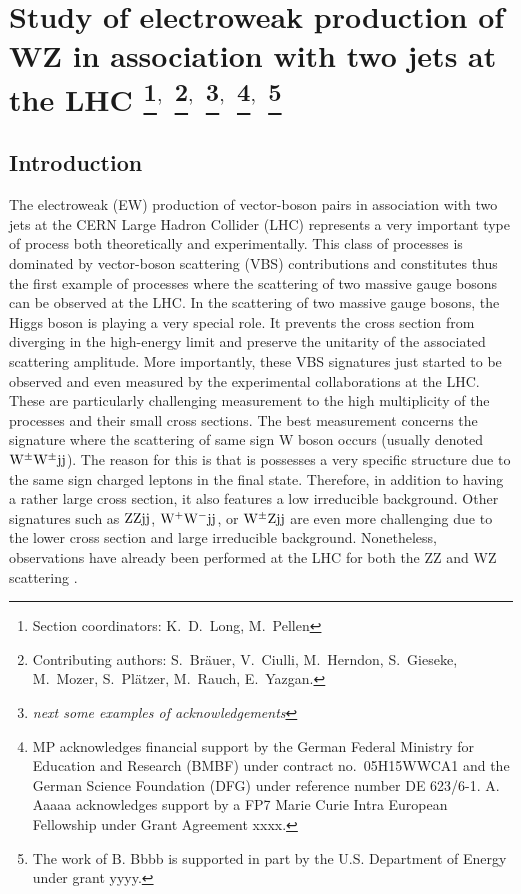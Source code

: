 \documentclass[11pt]{cernrep}
\newcommand{\MP}[1]{{ {\color{blue}{ [MP: #1]}} }}
\begin{document}
\section{Study of electroweak production of WZ in association with two
  jets at the LHC \protect\footnote{Section
    coordinators: K.~D.~Long, M.~Pellen}$^{,}$ \protect\footnote{Contributing authors:
    S.~Br\"auer, V.~Ciulli, M.~Herndon, S.~Gieseke, M.~Mozer, S.~Pl{\"a}tzer,
    M.~Rauch, E.~Yazgan.}$^{,}$
  \protect\footnote{{\it next some examples of acknowledgements}}$^{,}$
  \protect\footnote{MP acknowledges financial support by the
German Federal Ministry for Education and Research (BMBF) under
contract no.~05H15WWCA1 and the German Science Foundation (DFG) under
reference number DE 623/6-1. A. Aaaaa acknowledges support by a FP7 Marie
    Curie Intra European Fellowship under Grant Agreement xxxx.}$^{,}$
\protect\footnote{The work of B. Bbbb is supported in part by the
  U.S. Department of Energy under grant yyyy.} \label{vbs_section}}

\subsection{Introduction \label{vbs_intro}}

The electroweak (EW) production of vector-boson pairs in association with two jets at the CERN Large Hadron Collider (LHC) represents a very important type of process both theoretically and experimentally.
This class of processes is dominated by vector-boson scattering (VBS) contributions and constitutes thus the first example of processes where the scattering of two massive gauge bosons can be observed at the LHC.
In the scattering of two massive gauge bosons, the Higgs boson is playing a very special role.
It prevents the cross section from diverging in the high-energy limit and preserve the unitarity of the associated scattering amplitude.
More importantly, these VBS signatures just started to be observed and even measured by the experimental collaborations at the LHC.
These are particularly challenging measurement to the high multiplicity of the processes and their small cross sections.
The best measurement \cite{Aad:2014zda,Khachatryan:2014sta,Sirunyan:2017ret,Aaboud:2016ffv} concerns the signature where the scattering of same sign W boson occurs (usually denoted ${\rm W}^\pm{\rm W}^\pm{\rm j}{\rm j}$).
The reason for this is that is possesses a very specific structure due to the same sign charged leptons in the final state.
Therefore, in addition to having a rather large cross section, it also features a low irreducible background.
Other signatures such as ${\rm Z}{\rm Z}{\rm j}{\rm j}$, ${\rm W}^+{\rm W}^-{\rm j}{\rm j}$, or ${\rm W}^{\pm}{\rm Z}{\rm j}{\rm j}$ are even more challenging due to the lower cross section and large irreducible background.
Nonetheless, observations have already been performed at the LHC for both the ZZ \cite{CMS-PAS-SMP-16-019} and WZ \cite{Aad:2016ett} scattering \MP{Experimental references to be added/modified.}.
\end{document}
